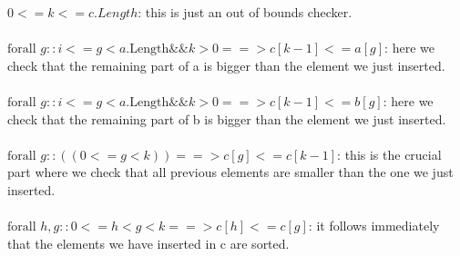 \documentclass{article}
\theoremstyle{remark}
\begin{document}
$0<=k<=c.Length$: this is just an out of bounds checker.\\\\
$\text{forall } g :: i<=g<a.\text{Length}\&\&k>0 ==> c[k-1]<=a[g]$: here we check that the remaining part of a is bigger than the element we just inserted.\\\\
$\text{forall } g :: i<=g<a.\text{Length}\&\&k>0 ==> c[k-1]<=b[g]$: here we check that the remaining part of b is bigger than the element we just inserted.\\\\
$\text{forall } g :: ((0<=g<k)) ==> c[g]<=c[k-1]$: this is the crucial part where we check that all previous elements are smaller than the one we just inserted.\\\\
$\text{forall } h,g :: 0<=h<g<k ==> c[h]<=c[g]$: it follows immediately that the elements we have inserted in c are sorted.
\end{document}
